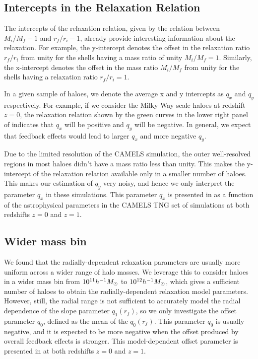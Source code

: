 \subsection*{Intercepts in the Relaxation Relation}

The intercepts of the relaxation relation, given by the relation between $M_i/M_f-1$ and $r_f/r_i-1$, already provide interesting information about the relaxation. For example, the y-intercept denotes the offset in the relaxation ratio $r_f/r_i$ from unity for the shells having a mass ratio of unity $M_i/M_f=1$. Similarly, the x-intercept denotes the offset in the mass ratio $M_i/M_f$ from unity for the shells having a relaxation ratio $r_f/r_i = 1$.

In a given sample of haloes, we denote the average x and y intercepts as $q_x$ and $q_y$ respectively. For example, if we consider the Milky Way scale haloes at redshift $z=0$, the relaxation relation shown by the green curves in the lower right panel of  indicates that $q_x$ will be positive and $q_y$ will be negative. In general, we expect that feedback effects would lead to larger $q_x$ and more negative $q_y$.

Due to the limited resolution of the CAMELS simulation, the outer well-resolved regions in most haloes didn't have a mass ratio less than unity. This makes the y-intercept of the relaxation relation available only in a smaller number of haloes. This makes our estimation of $q_y$ very noisy, and hence we only interpret the parameter $q_x$ in these simulations. This parameter $q_x$ is presented in  as a function of the astrophysical parameters in the CAMELS TNG set of simulations at both redshifts $z=0$ and $z=1$.

\subsection*{Wider mass bin}

We found that the radially-dependent relaxation parameters are usually more uniform across a wider range of halo masses. We leverage this to consider haloes in a wider mass bin from $10^{11} h^{-1}M_{\odot}$ to $10^{12} h^{-1}M_{\odot}$, which gives a sufficient number of haloes to obtain the radially-dependent relaxation model parameters. However, still, the radial range is not sufficient to accurately model the radial dependence of the slope parameter $q_1(r_f)$, so we only investigate the offset parameter $q_0$, defined as the mean of the $q_0(r_f)$. This parameter $q_0$ is usually negative, and it is expected to be more negative when the offset produced by overall feedback effects is stronger. This model-dependent offset parameter is presented in  at both redshifts $z=0$ and $z=1$.

